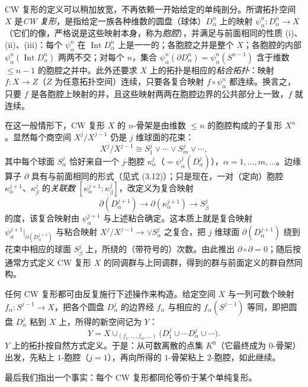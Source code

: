CW 复形的定义可以稍加放宽，不再依赖一开始给定的单纯剖分。所谓拓扑空间 $X$ 是\emph{CW 复形}，是指给定一族各种维数的圆盘（球体）$D_\alpha^n$ 上的映射 $\psi_\alpha^n:D_\alpha^n\to X$（它们的像，严格说是这些映射本身，称为\emph{胞腔}），并满足与前面相同的性质 (i)、(ii)、(iii)：每个 $\psi_\alpha^n$ 在 $\operatorname{Int}D_\alpha^n$ 上是一一的；各胞腔之并是整个 $X$；各胞腔的内部 $\psi_\alpha^n(\operatorname{Int}D_\alpha^n)$ 两两不交；对每个 $n$，集合 $\psi_\alpha^n(\partial D_\alpha^n)=\psi_\alpha^n(S^{n-1})$ 含于维数 $\le n-1$ 的胞腔之并中。此外还要求 $X$ 上的拓扑是相应的\emph{粘合拓扑}：映射 $f:X\to Z$（$Z$ 为任意拓扑空间）连续，只要各复合映射 $f\circ\psi_\alpha^n$ 都连续。换言之，只要 $f$ 是各胞腔上映射的并，且这些映射两两在胞腔边界的公共部分上一致，$f$ 就连续。

在这一般情形下，CW 复形 $X$ 的 $n$-骨架是由维数 $\le n$ 的胞腔构成的子复形 $X^n$。显然每个商空间 $X^j/X^{j-1}$ 仍是 $j$ 维球面的花束：
\[
  X^j/X^{j-1}\cong S^j_1\vee\cdots\vee S^j_m\vee\cdots,
\]
其中每个球面 $S^j_\alpha$ 恰好来自一个 $j$-胞腔 $\kappa_\alpha^j$（$=\psi_\alpha^j(D_\alpha^j)$），$\alpha=1,\dots,m,\dots$。边缘算子 $\partial$ 具有与前面相同的形式（见式 (3.12)）；只是现在，一对（定向）胞腔 $\kappa_\alpha^{j+1}$、$\kappa_\beta^j$ 的\emph{关联数} $[\kappa_\alpha^{j+1}:\kappa_\beta^j]$，改定义为复合映射
\[
  \partial(D_\alpha^{j+1})\to\partial(\kappa_\alpha^{j+1})\to S_\beta^j
\]
的度，该复合映射由 $\psi_\alpha^{j+1}$ 与上述粘合确定。这本质上就是复合映射 $\psi_\alpha^{j+1}|_{\partial(D_\alpha^{j+1})}$ 与粘合映射 $X^j/X^{j-1}\to\vee S_\alpha^j$ 之复合，把 $j$ 维球面 $\partial(D_\alpha^{j+1})$ 绕到花束中相应的球面 $S_\beta^j$ 上，所绕的（带符号的）次数。由此推出 $\partial\circ\partial=0$；随后按通常方式定义 CW 复形 $X$ 的同调群与上同调群，得到的群与前面定义的群自然同构。

任何 CW 复形都可由反复施行下述操作来构造。给定空间 $X$ 与一列可数个映射 $f_\alpha:S^{j-1}\to X$，把各个圆盘 $D_\alpha^j$ 的边界经 $f_\alpha$ 与相应的 $f_\alpha(S^{j-1})$ 等同，即把圆盘 $D_\alpha^j$ 粘到 $X$ 上，所得的新空间记为 $Y$：
\begin{equation}
  Y=X\cup_{(f_1,\dots,f_\alpha,\dots)}\bigl(D_1^j\cup\cdots D_\alpha^j\cup\cdots\bigr). \tag{3.13}
\end{equation}
$Y$ 上的拓扑按自然方式定义。于是：从可数离散的点集 $K^0$（它最终成为 $0$-骨架）出发，先粘上 $1$-胞腔（$j=1$），再向所得的 $1$-骨架粘上 $2$-胞腔，如此继续。

最后我们指出一个事实：每个 CW 复形都同伦等价于某个单纯复形。

